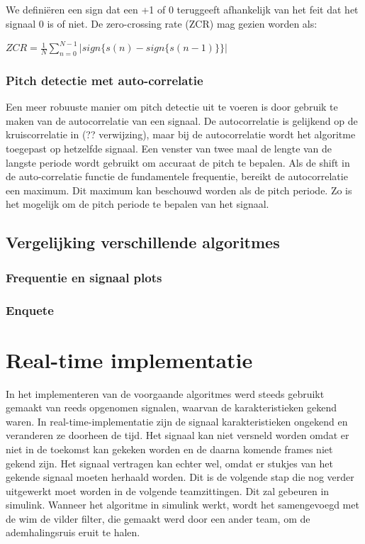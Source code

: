 \documentclass[12pt]{report}
\begin{document}
We definiëren een sign {} dat een +1 of 0 teruggeeft afhankelijk van het feit dat het signaal 0 is of niet. De zero-crossing rate (ZCR) mag gezien worden als:
\begin{center}
$ZCR=\frac{1}{N} \sum\limits_{n=0}^{N-1} |sign\{s(n)-sign\{s(n-1)\}\}|$
\end{center}

\subsection{Pitch detectie met auto-correlatie}
Een meer robuuste manier om pitch detectie uit te voeren is door gebruik te maken van de autocorrelatie van een signaal. De autocorrelatie is gelijkend op de kruiscorrelatie in (?? verwijzing), maar bij de autocorrelatie wordt het algoritme toegepast op hetzelfde signaal. 
Een venster van twee maal de lengte van de langste periode wordt  gebruikt om accuraat de pitch te bepalen. Als de shift in de auto-correlatie functie de fundamentele frequentie, bereikt de autocorrelatie een maximum. Dit maximum kan beschouwd worden als de pitch periode. Zo is het mogelijk om de pitch periode te bepalen van het signaal. 


\section{Vergelijking verschillende algoritmes}
\subsection{Frequentie en signaal plots}
\subsection{Enquete}



\chapter*{Real-time implementatie}
In het implementeren van de voorgaande algoritmes werd steeds gebruikt gemaakt van reeds opgenomen signalen, waarvan de karakteristieken gekend waren. In real-time-implementatie zijn de signaal karakteristieken ongekend en veranderen ze doorheen de tijd. Het signaal kan niet versneld worden omdat er niet in de toekomst kan gekeken worden en de daarna komende frames niet gekend zijn. Het signaal vertragen kan echter wel, omdat er stukjes van het gekende signaal moeten herhaald worden. Dit is de volgende stap die nog verder uitgewerkt moet worden in de volgende teamzittingen. Dit zal gebeuren in simulink. Wanneer het algoritme in simulink werkt, wordt het samengevoegd met de wim de vilder filter, die gemaakt werd door een ander team, om de ademhalingsruis eruit te halen.
\end{document}
